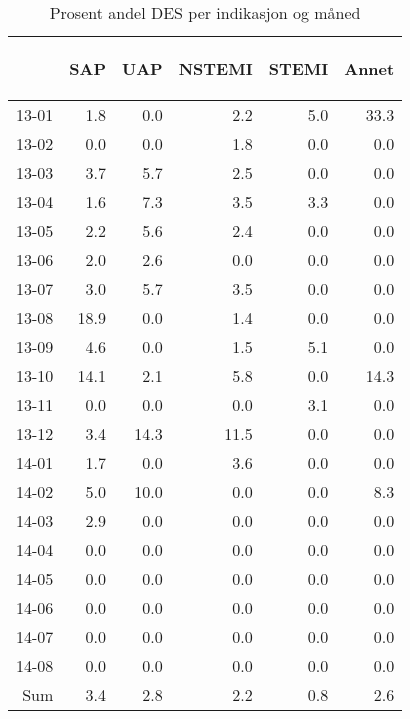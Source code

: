 \documentclass[presentation,xcolor=pdftex,dvipsnames,table]{beamer}
\begin{document}
\begin{frame}
\begin{tiny}
\begin{table}[ht]
\centering
\begin{tabular}{rrrrrr}
  \toprule
 & \begin{sideways} SAP \end{sideways} & \begin{sideways} UAP \end{sideways} & \begin{sideways} NSTEMI \end{sideways} & \begin{sideways} STEMI \end{sideways} & \begin{sideways} Annet \end{sideways} \\ 
  \midrule
13-01 & 1.8 & 0.0 & 2.2 & 5.0 & 33.3 \\ 
  13-02 & 0.0 & 0.0 & 1.8 & 0.0 & 0.0 \\ 
  13-03 & 3.7 & 5.7 & 2.5 & 0.0 & 0.0 \\ 
  13-04 & 1.6 & 7.3 & 3.5 & 3.3 & 0.0 \\ 
  13-05 & 2.2 & 5.6 & 2.4 & 0.0 & 0.0 \\ 
  13-06 & 2.0 & 2.6 & 0.0 & 0.0 & 0.0 \\ 
  13-07 & 3.0 & 5.7 & 3.5 & 0.0 & 0.0 \\ 
  13-08 & 18.9 & 0.0 & 1.4 & 0.0 & 0.0 \\ 
  13-09 & 4.6 & 0.0 & 1.5 & 5.1 & 0.0 \\ 
  13-10 & 14.1 & 2.1 & 5.8 & 0.0 & 14.3 \\ 
  13-11 & 0.0 & 0.0 & 0.0 & 3.1 & 0.0 \\ 
  13-12 & 3.4 & 14.3 & 11.5 & 0.0 & 0.0 \\ 
  14-01 & 1.7 & 0.0 & 3.6 & 0.0 & 0.0 \\ 
  14-02 & 5.0 & 10.0 & 0.0 & 0.0 & 8.3 \\ 
  14-03 & 2.9 & 0.0 & 0.0 & 0.0 & 0.0 \\ 
  14-04 & 0.0 & 0.0 & 0.0 & 0.0 & 0.0 \\ 
  14-05 & 0.0 & 0.0 & 0.0 & 0.0 & 0.0 \\ 
  14-06 & 0.0 & 0.0 & 0.0 & 0.0 & 0.0 \\ 
  14-07 & 0.0 & 0.0 & 0.0 & 0.0 & 0.0 \\ 
  14-08 & 0.0 & 0.0 & 0.0 & 0.0 & 0.0 \\ 
  Sum & 3.4 & 2.8 & 2.2 & 0.8 & 2.6 \\ 
   \bottomrule
\end{tabular}
\caption{Prosent andel DES per indikasjon og måned} 
\end{table}\end{tiny}
\end{frame}
\end{document}
